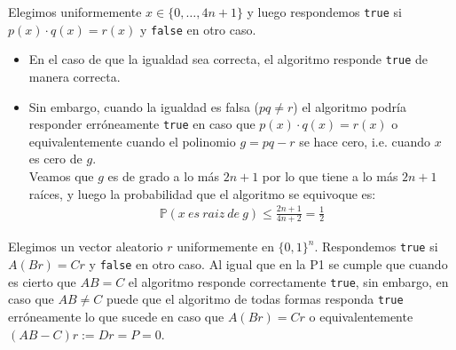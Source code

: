 \documentclass[dcc,uchile]{fcfmcourse}
\begin{document}
\newpage
\begin{problems}
\problem
Elegimos uniformemente $x \in \{0, \ldots, 4n+1\}$ y luego respondemos \texttt{true} si $p(x)\cdot q(x) = r(x)$ y \texttt{false} en otro caso. 
\begin{itemize}
    \item En el caso de que la igualdad sea correcta, el algoritmo responde \texttt{true} de manera correcta.
    \item Sin embargo, cuando la igualdad es falsa ($pq\not =r$) el algoritmo podría responder erróneamente \texttt{true} en caso que $p(x)\cdot q(x) = r(x)$ o equivalentemente cuando el polinomio $g = pq - r$ se hace cero, i.e. cuando $x$ es cero de $g$.\\
    Veamos que $g$ es de grado a lo más $2n+1$ por lo que tiene a lo más $2n+1$ raíces, y luego la probabilidad que el algoritmo se equivoque es:
    \begin{align*}
        \mathbb{P}(x\ es\ raiz\ de\ g) \le \frac{2n+1}{4n+2} = \frac{1}{2}
    \end{align*}
\end{itemize}
\problem
Elegimos un vector aleatorio $r$ uniformemente en $\{0, 1\}^n$. Respondemos \texttt{true} si $A(Br) = Cr$ y \texttt{false} en otro caso. Al igual que en la P1 se cumple que cuando es cierto que $AB = C$ el algoritmo responde correctamente \texttt{true}, sin embargo, en caso que $AB \not = C$ puede que el algoritmo de todas formas responda \texttt{true} erróneamente lo que sucede en caso que $A(Br) = Cr$ o equivalentemente $(AB-C) r := Dr = P = 0$.\\


\end{problems}
\end{document}
